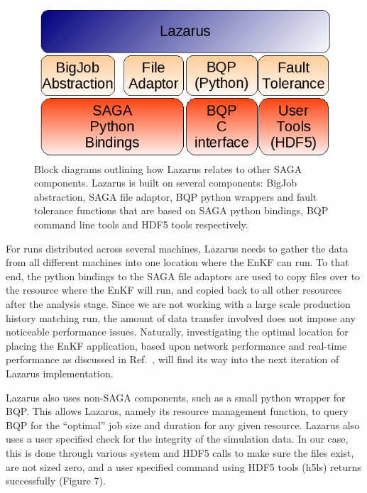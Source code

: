 \documentclass{sig-alternate}
\newcommand{\up}{\vspace*{-0.3em}}
\begin{document}
\begin{figure} 
  \begin{center} \includegraphics[scale=0.5]{./figures/Architecture.png} \caption{Block diagrams outlining how Lazarus relates to other SAGA components. Lazarus is built on several components: BigJob abstraction, SAGA file adaptor, BQP python wrappers and fault tolerance functions that are based on SAGA python bindings, BQP command line tools and HDF5 tools respectively.}\label{fig:application_architecture}
\up\up\up\up\up\up\up\up\up\up\up\up

\end{center}
\end{figure}
 
For runs distributed across several machines, Lazarus needs to gather the data from all different machines into one location where the EnKF can run. To that end, the python bindings to the SAGA file adaptors are used to copy files over to the resource where the EnKF will run, and copied back to all other resources after the analysis stage. Since we are not working with a large scale production history matching run, the amount of data transfer involved does not impose any noticeable performance issues. Naturally, investigating the optimal location for placing the EnKF application, based upon network performance and real-time performance as discussed in Ref.~\cite{escience07}, will find its way into the next iteration of Lazarus implementation.

Lazarus also uses non-SAGA components, such as a small python wrapper
for BQP. This allows Lazarus, namely its resource management function,
to query BQP for the ``optimal'' job size and duration for any given
resource. Lazarus also uses a user specified check for the integrity
of the simulation data. In our case, this is done through various
system and HDF5 calls to make sure the files exist, are not sized
zero, and a user specified command using HDF5 tools (h5ls) returns
successfully (Figure 7).
\end{document}
